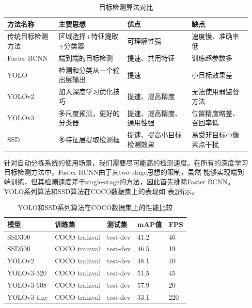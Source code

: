 {
    \begin{table}[htb] 
        \caption{目标检测算法对比}
        \label{table:OC:compare}
        \centering
        \begin{tabular}[t]{l|l|p{3cm}|p{3cm}}
            \hline
            方法名称 & 主要思想 & 优点 & 缺点  \\
            \hline
            传统目标检测方法   & 区域选择+特征提取+分类器 & 可理解性强 & 速度慢、准确率低 \\
            \hline 
            Faster RCNN   & 端到端的目标检测 & 提速、共用特征 & 训练超参数多 \\
            \hline
            YOLO   & 检测和分类从一个输出层输出 & 提速 & 小目标效果差 \\
            \hline
            YOLOv2   & 加入深度学习优化技巧 & 提速、提高精度 & 无法使用弱监督方法 \\
            \hline
            YOLOv3   & 多尺度预测，更好的分类器 & 提速、提高精度、通用性强 & 位置精度略差、召回率低 \\
            \hline
            SSD   & 多特征层提取检测框 & 提速、提高小目标检测效果 & 易受非目标小像素点干扰 \\
            \hline
        \end{tabular} 
    \end{table}
}

针对自动分拣系统的使用场景，我们需要尽可能高的检测速度。在所有的深度学习目标检测方法中，Faster RCNN由于其two-stage思想的限制，虽然
能够实现端到端训练，但其检测速度差于single-stage的方法，因此首先排除Faster RCNN。YOLO系列算法和SSD算法在COCO\cite{COCO}数据集上的表现如
表\ref{table:COCO:compare}\cite{YOLOv3:2018}所示。

{
    \begin{table}[htb] 
        \caption{YOLO和SSD系列算法在COCO数据集上的性能比较}
        \label{table:COCO:compare}
        \centering
        \begin{tabular}[t]{l|l|l|l|l}
            \hline
            模型 & 训练集 & 测试集 & mAP值\cite{mAP} & FPS  \\
            \hline
            SSD300   & COCO trainval & test-dev & 41.2 & 46 \\
            \hline 
            SSD500   & COCO trainval & test-dev & 46.5 & 19 \\
            \hline
            YOLOv2   & COCO trainval & test-dev & 48.1 & 40 \\
            \hline
            YOLOv3-320   & COCO trainval & test-dev & 51.5 & 45 \\
            \hline
            YOLOv3-608   & COCO trainval & test-dev & 57.9 & 20 \\
            \hline
            YOLOv3-tiny & COCO trainval & test-dev & 33.1 & 220\\
            \hline
        \end{tabular} 
    \end{table}
}

